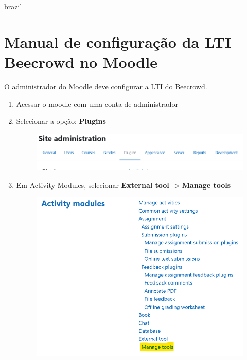 \begin{otherlanguage*}{brazil}

\chapter{Manual de configuração da LTI Beecrowd no Moodle}

O administrador do Moodle deve configurar a LTI do Beecrowd.


\begin{enumerate}
    \item Acessar o moodle com uma conta de administrador
    \item Selecionar a opção: \textbf{Plugins}

    \begin{figure}[h!]
        \centering
            \includegraphics[scale=0.45]{pictures/apendices/apendice_a_1.png}
    \end{figure}

    \item Em Activity Modules, selecionar \textbf{External tool} -> \textbf{Manage tools}

    \begin{figure}[h!]
        \centering
            \includegraphics[scale=0.5]{pictures/apendices/apendice_a_2.png}
    \end{figure}


\end{enumerate}
\end{otherlanguage*}

